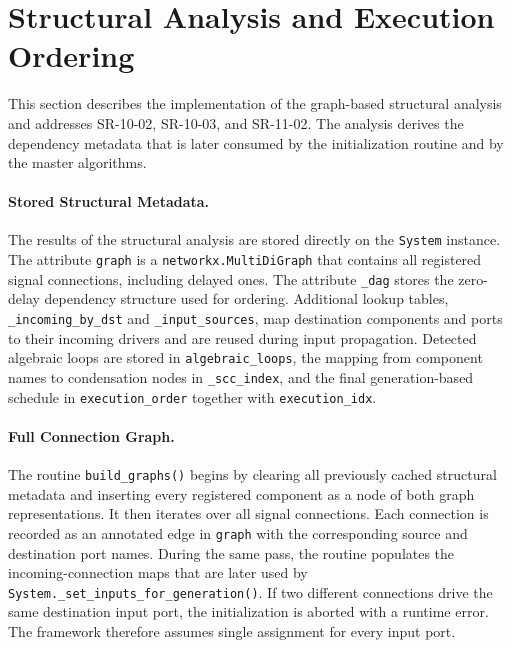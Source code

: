 \section{Structural Analysis and Execution Ordering}
\label{sec:impl_structural}

This section describes the implementation of the graph-based structural analysis and addresses SR-10-02, SR-10-03, and SR-11-02.
The analysis derives the dependency metadata that is later consumed by the initialization routine and by the master algorithms.

\paragraph{Stored Structural Metadata.}
The results of the structural analysis are stored directly on the \texttt{System} instance.
The attribute \texttt{graph} is a \texttt{networkx.MultiDiGraph} that contains all registered signal connections, including delayed ones.
The attribute \texttt{\_dag} stores the zero-delay dependency structure used for ordering.
Additional lookup tables, \texttt{\_incoming\_by\_dst} and \texttt{\_input\_sources}, map destination components and ports to their incoming drivers and are reused during input propagation.
Detected algebraic loops are stored in \texttt{algebraic\_loops}, the mapping from component names to condensation nodes in \texttt{\_scc\_index}, and the final generation-based schedule in \texttt{execution\_order} together with \texttt{execution\_idx}.

\paragraph{Full Connection Graph.}
The routine \texttt{build\_graphs()} begins by clearing all previously cached structural metadata and inserting every registered component as a node of both graph representations.
It then iterates over all signal connections.
Each connection is recorded as an annotated edge in \texttt{graph} with the corresponding source and destination port names.
During the same pass, the routine populates the incoming-connection maps that are later used by \texttt{System.\_set\_inputs\_for\_generation()}.
If two different connections drive the same destination input port, the initialization is aborted with a runtime error.
The framework therefore assumes single assignment for every input port.

